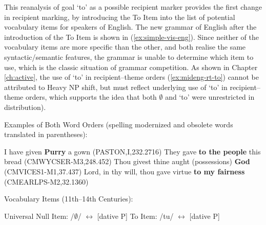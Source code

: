 	This reanalysis of goal `to' as a possible recipient marker provides the first change in recipient marking, by introducing the To Item into the list of potential vocabulary items for speakers of English. The new grammar of English after the introduction of the To Item is shown in (\ref{ex:simple-vis-eng}). Since neither of the vocabulary items are more specific than the other, and both realise the same syntactic/semantic features, the grammar is unable to determine which item to use, which is the classic situation of grammar competition. As shown in Chapter \ref{ch:active}, the use of `to' in recipient--theme orders (\ref{ex:mideng-rt-to}) cannot be attributed to Heavy NP shift, but must reflect underlying use of `to' in recipient--theme orders, which supports the idea that both $\emptyset$ and `to' were unrestricted in distribution). 

	\begin{exe}
		\ex Examples of Both Word Orders (spelling modernized and obsolete words translated in parentheses):
		\begin{xlist}
			\ex I have given \textbf{Purry} a gown (PASTON,I,232.2716)
			\ex They gave \textbf{to the people} this bread (CMWYCSER-M3,248.452)\label{ex:mideng-rt-to}
			\ex Thou givest thine aught (possessions) \textbf{God} (CMVICES1-M1,37.437)
			\ex Lord, in thy will, thou gave virtue \textbf{to my fairness} (CMEARLPS-M2,32.1360)
		\end{xlist}
		\ex Vocabulary Items (11th--14th Centuries):\label{ex:simple-vis-eng}
		\begin{xlist}
			\ex Universal Null Item: /$\emptyset$/ $\leftrightarrow$ [dative P]
			\ex To Item: /tu/ $\leftrightarrow$ [dative P]
		\end{xlist}
	\end{exe}

